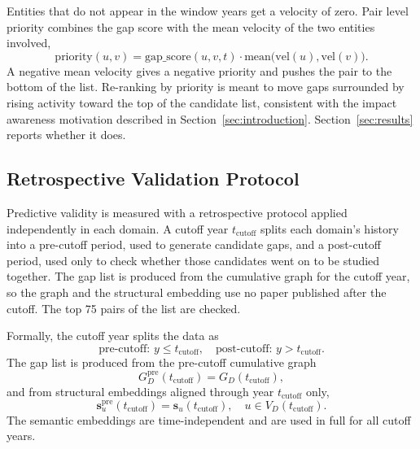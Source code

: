 \documentclass{ieeeaccess}
\begin{document}
Entities that do not appear in the window years get a velocity of zero. Pair level priority combines the gap score with the mean velocity of the two entities involved,
\begin{equation}
\text{priority}(u, v) = \text{gap\_score}(u, v, t) \cdot \text{mean}\big(\text{vel}(u), \text{vel}(v)\big).
\label{eq:priority}
\end{equation}
A negative mean velocity gives a negative priority and pushes the pair to the bottom of the list. Re-ranking by priority is meant to move gaps surrounded by rising activity toward the top of the candidate list, consistent with the impact awareness motivation described in Section~\ref{sec:introduction}. Section~\ref{sec:results} reports whether it does.

\subsection{Retrospective Validation Protocol}
\label{sec:validation}

Predictive validity is measured with a retrospective protocol applied independently in each domain. A cutoff year $t_{\text{cutoff}}$ splits each domain's history into a pre-cutoff period, used to generate candidate gaps, and a post-cutoff period, used only to check whether those candidates went on to be studied together. The gap list is produced from the cumulative graph for the cutoff year, so the graph and the structural embedding use no paper published after the cutoff. The top 75 pairs of the list are checked.

Formally, the cutoff year splits the data as
\begin{equation}
\text{pre-cutoff: } y \leq t_{\text{cutoff}}, \quad \text{post-cutoff: } y > t_{\text{cutoff}}.
\label{eq:cutoff_split}
\end{equation}
The gap list is produced from the pre-cutoff cumulative graph
\begin{equation}
G_D^{\text{pre}}(t_{\text{cutoff}}) = G_D(t_{\text{cutoff}}),
\label{eq:pre_graph}
\end{equation}
and from structural embeddings aligned through year $t_{\text{cutoff}}$ only,
\begin{equation}
\mathbf{s}_u^{\text{pre}}(t_{\text{cutoff}}) = \mathbf{s}_u(t_{\text{cutoff}}), \quad u \in V_D(t_{\text{cutoff}}).
\label{eq:pre_embs}
\end{equation}
The semantic embeddings are time-independent and are used in full for all cutoff years.
\end{document}
